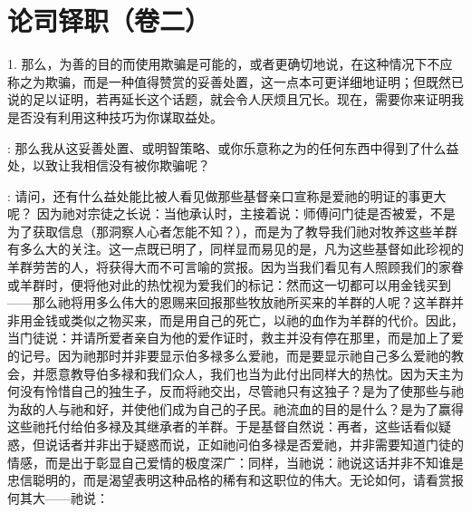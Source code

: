 

\section{论司铎职（卷二）}

1. 那么，为善的目的而使用欺骗是可能的，或者更确切地说，在这种情况下不应称之为欺骗，而是一种值得赞赏的妥善处置，这一点本可更详细地证明；但既然已说的足以证明，若再延长这个话题，就会令人厌烦且冗长。现在，需要你来证明我是否没有利用这种技巧为你谋取益处。\par

: 那么我从这妥善处置、或明智策略、或你乐意称之为的任何东西中得到了什么益处，以致让我相信没有被你欺骗呢？\par

: 请问，还有什么益处能比被人看见做那些基督亲口宣称是爱祂的明证的事更大呢？ 因为祂对宗徒之长说：当他承认时，主接着说：师傅问门徒是否被爱，不是为了获取信息（那洞察人心者怎能不知？），而是为了教导我们祂对牧养这些羊群有多么大的关注。这一点既已明了，同样显而易见的是，凡为这些基督如此珍视的羊群劳苦的人，将获得大而不可言喻的赏报。因为当我们看见有人照顾我们的家眷或羊群时，便将他对此的热忱视为爱我们的标记：然而这一切都可以用金钱买到——那么祂将用多么伟大的恩赐来回报那些牧放祂所买来的羊群的人呢？这羊群并非用金钱或类似之物买来，而是用自己的死亡，以祂的血作为羊群的代价。因此，当门徒说：并请所爱者亲自为他的爱作证时，救主并没有停在那里，而是加上了爱的记号。因为祂那时并非要显示伯多禄多么爱祂，而是要显示祂自己多么爱祂的教会，并愿意教导伯多禄和我们众人，我们也当为此付出同样大的热忱。因为天主为何没有怜惜自己的独生子，反而将祂交出，尽管祂只有这独子？是为了使那些与祂为敌的人与祂和好，并使他们成为自己的子民。祂流血的目的是什么？是为了赢得这些祂托付给伯多禄及其继承者的羊群。于是基督自然说：再者，这些话看似疑惑，但说话者并非出于疑惑而说，正如祂问伯多禄是否爱祂，并非需要知道门徒的情感，而是出于彰显自己爱情的极度深广：同样，当祂说：祂说这话并非不知谁是忠信聪明的，而是渴望表明这种品格的稀有和这职位的伟大。无论如何，请看赏报何其大——祂说：\par

